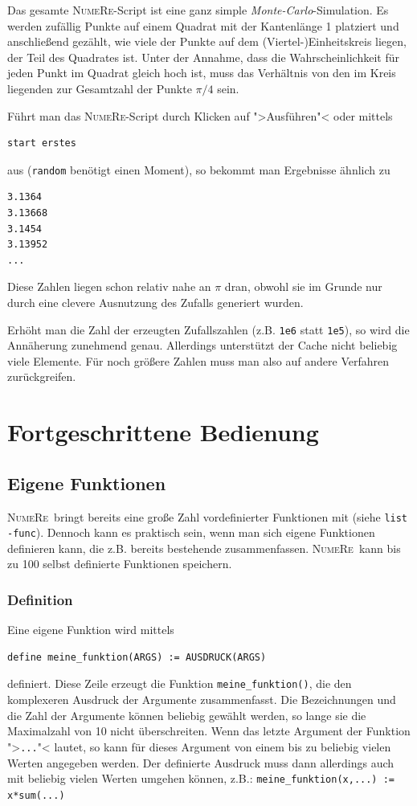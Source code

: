 \documentclass[DIV=14,headsepline,footsepline]{scrbook}
\newcommand{\NR}{\textsc{Nu\-me\-Re}}
\begin{document}
				Das gesamte \NR-Script ist eine ganz simple \emph{Monte-Carlo}-Simulation. Es werden zufällig Punkte auf einem Quadrat mit der Kantenlänge 1 platziert und anschließend gezählt, wie viele der Punkte auf dem (Viertel-)Einheitskreis liegen, der Teil des Quadrates ist. Unter der Annahme, dass die Wahrscheinlichkeit für jeden Punkt im Quadrat gleich hoch ist, muss das Verhältnis von den im Kreis liegenden zur Gesamtzahl der Punkte $\pi/4$ sein.
				
				Führt man das \NR-Script durch Klicken auf ">Ausführen"< oder mittels
				\begin{lstlisting}
start erstes
				\end{lstlisting}
				aus (\lstinline+random+ benötigt einen Moment), so bekommt man Ergebnisse ähnlich zu
				\begin{lstlisting}
3.1364
3.13668
3.1454
3.13952
...
				\end{lstlisting}
				Diese Zahlen liegen schon relativ nahe an $\pi$ dran, obwohl sie im Grunde nur durch eine clevere Ausnutzung des Zufalls generiert wurden.
				
				Erhöht man die Zahl der erzeugten Zufallszahlen (z.B. \lstinline+1e6+ statt \lstinline+1e5+), so wird die Annäherung zunehmend genau. Allerdings unterstützt der Cache nicht beliebig viele Elemente. Für noch größere Zahlen muss man also auf andere Verfahren zurückgreifen.
	\part{Fortgeschrittene Bedienung}
		\chapter{Eigene Funktionen}
			\NR\ bringt bereits eine große Zahl vordefinierter Funktionen mit (siehe \lstinline+list -func+). Dennoch kann es praktisch sein, wenn man sich eigene Funktionen definieren kann, die z.B. bereits bestehende zusammenfassen. \NR\ kann bis zu 100 selbst definierte Funktionen speichern.
			\section{Definition}
				Eine eigene Funktion wird mittels
				\begin{lstlisting}
define meine_funktion(ARGS) := AUSDRUCK(ARGS)
				\end{lstlisting}
				definiert. Diese Zeile erzeugt die Funktion \lstinline+meine_funktion()+, die den komplexeren Ausdruck der Argumente zusammenfasst. Die Bezeichnungen und die Zahl der Argumente können beliebig gewählt werden, so lange sie die Maximalzahl von 10 nicht überschreiten. Wenn das letzte Argument der Funktion ">\lstinline+...+"< lautet, so kann für dieses Argument von einem bis zu beliebig vielen Werten angegeben werden. Der definierte Ausdruck muss dann allerdings auch mit beliebig vielen Werten umgehen können, z.B.: \lstinline+meine_funktion(x,...) := x*sum(...)+
				
\end{document}
